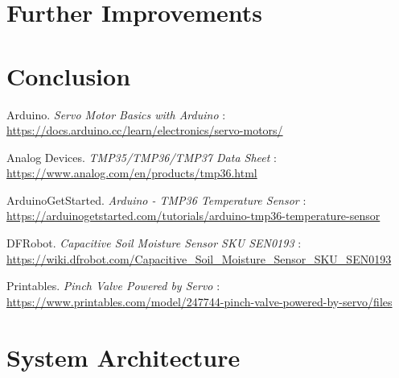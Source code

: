 \documentclass[a4paper,11pt]{article}
\begin{document}
\section{Further Improvements}
\label{sec:further_improvements}

\section{Conclusion}
\label{sec:conclusion}

\begin{thebibliography}{9}

Arduino. \textit{Servo Motor Basics with Arduino} : \\
\url{https://docs.arduino.cc/learn/electronics/servo-motors/}

Analog Devices. \textit{TMP35/TMP36/TMP37 Data Sheet} : \\
\url{https://www.analog.com/en/products/tmp36.html} 

ArduinoGetStarted. \textit{Arduino - TMP36 Temperature Sensor} : \\
\url{https://arduinogetstarted.com/tutorials/arduino-tmp36-temperature-sensor}

DFRobot. \textit{Capacitive Soil Moisture Sensor SKU SEN0193} : \\
\url{https://wiki.dfrobot.com/Capacitive_Soil_Moisture_Sensor_SKU_SEN0193}

Printables. \textit{Pinch Valve Powered by Servo} : \\
\url{https://www.printables.com/model/247744-pinch-valve-powered-by-servo/files}

\end{thebibliography}

\newpage
\appendix

\section{System Architecture}
\end{document}
